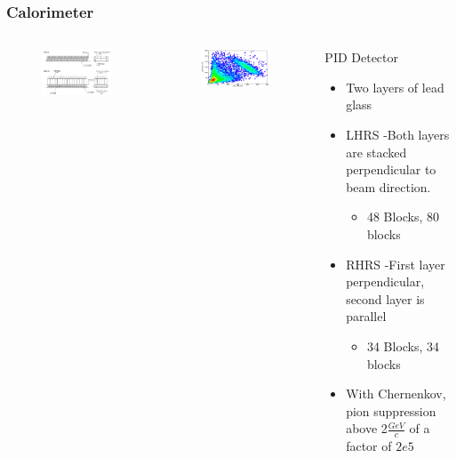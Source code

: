 \documentclass{beamer}
\begin{document}
\begin{frame}
\frametitle{Calorimeter}

\begin{columns}[t]
	\vspace{-25pt}
	\begin{figure}
		\includegraphics[width=6cm]{../images/calo}
	\end{figure}
	\vspace{-10pt}
	\begin{figure}
		\includegraphics[width=6cm]{../images/PR1_2}
	\end{figure}	

	\begin{block}{PID Detector}
	\begin{itemize}
		\item Two layers of lead glass
		\item LHRS -Both layers are stacked perpendicular to beam direction.
		\vspace{-13pt}
 		\begin{itemize}
			\item 48 Blocks, 80 blocks
		\end{itemize}
		\item RHRS -First layer perpendicular, second layer is parallel
		\begin{itemize}
			\item 34 Blocks, 34 blocks
		\end{itemize}
		\item With Chernenkov, pion suppression above 2$\frac{GeV}{c}$ of a factor of $2e5$ \cite{nim}
	\end{itemize}
	\end{block}
\end{columns}
\end{frame}
\end{document}
